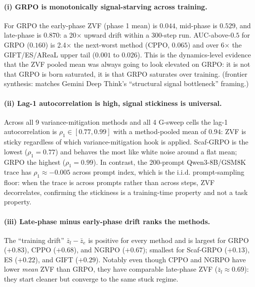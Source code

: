 \documentclass{article}
\begin{document}
\paragraph{(i) GRPO is monotonically signal-starving across training.}
For GRPO the early-phase ZVF (phase 1 mean) is $0.044$, mid-phase is
$0.529$, and late-phase is $0.870$: a 20$\times$ upward drift within
a 300-step run. AUC-above-$0.5$ for GRPO ($0.160$) is 2.4$\times$ the
next-worst method (CPPO, $0.065$) and over 6$\times$ the GIFT/ES/AReaL
upper tail ($0.001$ to $0.026$). This is the dynamics-level evidence
that the ZVF pooled mean was always going to look elevated on GRPO: it
is not that GRPO is born saturated, it is that GRPO saturates over
training. (frontier synthesis: matches Gemini Deep Think's
``structural signal bottleneck'' framing.)

\paragraph{(ii) Lag-1 autocorrelation is high, signal stickiness is universal.}
Across all 9 variance-mitigation methods and all 4 G-sweep cells the
lag-1 autocorrelation is $\rho_1 \in [0.77, 0.99]$ with a method-pooled
mean of $0.94$: ZVF is sticky regardless of which variance-mitigation
hook is applied. Scaf-GRPO is the lowest ($\rho_1 = 0.77$) and behaves
the most like white noise around a flat mean; GRPO the highest
($\rho_1 = 0.99$). In contrast, the 200-prompt Qwen3-8B/GSM8K trace
has $\rho_1 \approx -0.005$ across prompt index, which is the i.i.d.
prompt-sampling floor: when the trace is across prompts rather than
across steps, ZVF decorrelates, confirming the stickiness is a
training-time property and not a task property.

\paragraph{(iii) Late-phase minus early-phase drift ranks the methods.}
The ``training drift'' $\bar z_l - \bar z_e$ is positive for every
method and is largest for GRPO ($+0.83$), CPPO ($+0.68$), and
NGRPO ($+0.67$); smallest for Scaf-GRPO ($+0.13$), ES ($+0.22$), and
GIFT ($+0.29$). Notably even though CPPO and NGRPO have lower
\emph{mean} ZVF than GRPO, they have comparable late-phase ZVF
($\bar z_l \approx 0.69$): they start cleaner but converge to the
same stuck regime.
\end{document}
